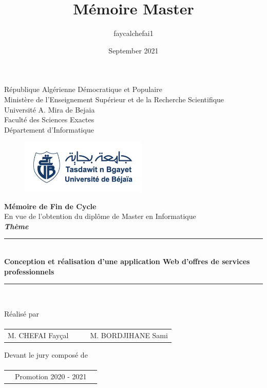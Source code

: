 \documentclass[french]{report}
\title{Mémoire Master}
\author{faycalchefai1 }
\date{September 2021}
\begin{document}


\begin{titlepage}
\begin{center}
    \large{République Algérienne Démocratique et Populaire}\\
    \large{Ministère de l'Enseignement Supérieur et de la Recherche Scientifique}\\
    \large{Université A. Mira de Bejaia}\\
    \large{Faculté des Sciences Exactes}\\
    \large{Département d'Informatique}\\

    \begin{figure}[h!]
    \centering
    \includegraphics[width=6cm]{images/logo1.jpg}
    \end{figure}
	
    \LARGE{\textbf{Mémoire de Fin de Cycle}} \\[2ex]
     En vue de l'obtention du diplôme de Master en Informatique \\[1ex]
    
    \textit{\textbf{Thème}}\\[1ex]
	\rule{11,5cm}{1pt}
    {\LARGE{\textbf{{\\Conception et réalisation d'une application Web d'offres
    de services professionnels \\}}}}
	\rule{11,5cm}{1pt}\\
	\vspace{0.2cm}
\end{center}

\begin{center}
    \large Réalisé par

    \paragraph{}

    \begin{tabular}{l l l l}	
        M. CHEFAI Fayçal & & & M. BORDJIHANE Sami \\
    \end{tabular}

    \large Devant le jury composé de
\end{center}
\paragraph{}

\begin{table}[h!]
    \centering
    \begin{tabular}{l l l }
     & Promotion 2020 - 2021 &	\\
    \end{tabular}    
\end{table}
\end{titlepage}
\end{document}
